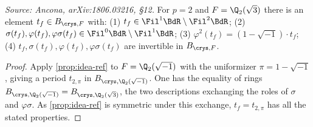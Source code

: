 \begin{proposition}[Period for \(F = \Q_2(\sqrt 3)\) (Colmez)]
  \label{prop:lubin-tate-wild2}
  \textit{Source: Ancona, arXiv:1806.03216, \S12.}
  For \(p = 2\) and \(F = \Q_2(\sqrt 3)\) there is an element
  \(t_f \in B_{\crys,F}\) with:
  (1) \(t_f \in \Fil^1 \BdR \setminus \Fil^2 \BdR\);
  (2) \(\sigma(t_f), \varphi(t_f), \varphi\sigma(t_f) \in \Fil^0 \BdR \setminus
  \Fil^1 \BdR\);
  (3) \(\varphi^2(t_f) = (1 - \sqrt{-1}) \cdot t_f\);
  (4) \(t_f, \sigma(t_f), \varphi(t_f), \varphi\sigma(t_f)\) are invertible in
  \(B_{\crys,F}\).
\end{proposition}

\begin{proof}
  Apply \cref{prop:idea-ref} to \(F = \Q_2(\sqrt{-1})\) with the uniformizer
  \(\pi = 1 - \sqrt{-1}\), giving a period \(t_{2,\pi}\) in
  \(B_{\crys,\Q_2(\sqrt{-1})}\). One has the equality of rings
  \(B_{\crys,\Q_2(\sqrt{-1})} = B_{\crys,\Q_2(\sqrt 3)}\), the two descriptions
  exchanging the roles of \(\sigma\) and \(\varphi\sigma\). As
  \cref{prop:idea-ref} is symmetric under this exchange, \(t_f = t_{2,\pi}\) has
  all the stated properties.
\end{proof}

